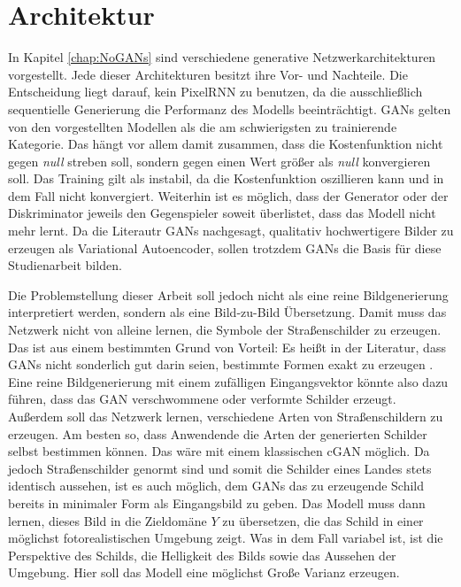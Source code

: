 \section{Architektur}
In Kapitel \ref{chap:NoGANs} sind verschiedene generative Netzwerkarchitekturen vorgestellt. Jede dieser Architekturen besitzt ihre Vor- und Nachteile. Die Entscheidung liegt darauf, kein \ac{PixelRNN} zu benutzen, da die ausschließlich sequentielle Generierung die Performanz des Modells beeinträchtigt. \acp{GAN} gelten von den vorgestellten Modellen als die am schwierigsten zu trainierende Kategorie. Das hängt vor allem damit zusammen, dass die Kostenfunktion nicht gegen \emph{null} streben soll, sondern gegen einen Wert größer als \emph{null} konvergieren soll. Das Training gilt als instabil, da die Kostenfunktion oszillieren kann und in dem Fall nicht konvergiert. Weiterhin ist es möglich, dass der Generator oder der Diskriminator jeweils den Gegenspieler soweit überlistet, dass das Modell nicht mehr lernt. Da die Literautr \acp{GAN} nachgesagt, qualitativ hochwertigere Bilder zu erzeugen als Variational Autoencoder, sollen trotzdem \acp{GAN} die Basis für diese Studienarbeit bilden. \cite{generativeModelsSurvey} \cite{generative-models-comparison}

Die Problemstellung dieser Arbeit soll jedoch nicht als eine reine Bildgenerierung interpretiert werden, sondern als eine Bild-zu-Bild Übersetzung. Damit muss das Netzwerk nicht von alleine lernen, die Symbole der Straßenschilder zu erzeugen. Das ist aus einem bestimmten Grund von Vorteil: Es heißt in der Literatur, dass \acp{GAN} nicht sonderlich gut darin seien, bestimmte Formen exakt zu erzeugen \cite{generativeModelsSurvey}. Eine reine Bildgenerierung mit einem zufälligen Eingangsvektor könnte also dazu führen, dass das \ac{GAN} verschwommene oder verformte Schilder erzeugt. Außerdem soll das Netzwerk lernen, verschiedene Arten von Straßenschildern zu erzeugen. Am besten so, dass Anwendende die Arten der generierten Schilder selbst bestimmen können. Das wäre mit einem klassischen \ac{cGAN} möglich. Da jedoch Straßenschilder genormt sind und somit die Schilder eines Landes stets identisch aussehen, ist es auch möglich, dem \acp{GAN} das zu erzeugende Schild bereits in minimaler Form als Eingangsbild zu geben. Das Modell muss dann lernen, dieses Bild in die Zieldomäne $Y$ zu übersetzen, die das Schild in einer möglichst fotorealistischen Umgebung zeigt. Was in dem Fall variabel ist, ist die Perspektive des Schilds, die Helligkeit des Bilds sowie das Aussehen der Umgebung. Hier soll das Modell eine möglichst Große Varianz erzeugen.


